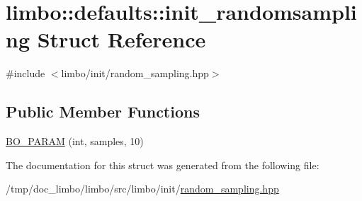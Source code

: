 \hypertarget{structlimbo_1_1defaults_1_1init__randomsampling}{}\section{limbo\+:\+:defaults\+:\+:init\+\_\+randomsampling Struct Reference}
\label{structlimbo_1_1defaults_1_1init__randomsampling}


{\ttfamily \#include $<$limbo/init/random\+\_\+sampling.\+hpp$>$}

\subsection*{Public Member Functions}
\begin{DoxyCompactItemize}
\item 
\hyperlink{group__init__defaults_ga74c4af5541464b6d880589e40dddfd54}{B\+O\+\_\+\+P\+A\+R\+AM} (int, samples, 10)
\end{DoxyCompactItemize}


The documentation for this struct was generated from the following file\+:\begin{DoxyCompactItemize}
\item 
/tmp/doc\+\_\+limbo/limbo/src/limbo/init/\hyperlink{random__sampling_8hpp}{random\+\_\+sampling.\+hpp}\end{DoxyCompactItemize}
